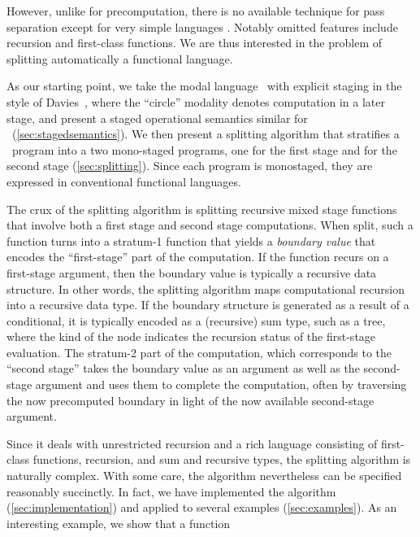 However, unlike for precomputation, there is no available technique
for pass separation except for very simple languages
\cite{knoblock96,Proudfoot:2001,Foley:2011,He:2014}.  Notably omitted
features include recursion and first-class functions.  We are thus
interested in the problem of splitting automatically a functional
language.
%


As our starting point, we take the modal language \lang\ with explicit
staging in the style of Davies~\cite{davies96}, where the ``circle''
modality denotes computation in a later stage, and present a staged
operational semantics similar for \lang\ (\ref{sec:stagedsemantics}).
We then present a splitting algorithm that stratifies a \lang\ program
into a two mono-staged programs, one for the first stage and for the
second stage (\ref{sec:splitting}).  Since each program is monostaged,
they are expressed in conventional functional languages.

The crux of the splitting algorithm is splitting recursive mixed stage
functions that involve both a first stage and second stage
computations.  When split, such a function turns into a stratum-1
function that yields a {\em boundary value} that encodes the
``first-stage'' part of the computation.  If the function recurs on a
first-stage argument, then the boundary value is typically a recursive
data structure.  In other words, the splitting algorithm maps
computational recursion into a recursive data type. If the boundary
structure is generated as a result of a conditional, it is typically
encoded as a (recursive) sum type, such as a tree, where the kind of
the node indicates the recursion status of the first-stage evaluation.
The stratum-2 part of the computation, which corresponds to the
``second stage'' takes the boundary value as an argument as well as
the second-stage argument and uses them to complete the computation,
often by traversing the now precomputed boundary in light of the now
available second-stage argument.

Since it deals with unrestricted recursion and a rich language
consisting of first-class functions, recursion, and sum and recursive
types, the splitting algorithm is naturally complex. With some care,
the algorithm nevertheless can be specified reasonably succinctly.  In
fact, we have implemented the algorithm (\ref{sec:implementation}) and
applied to several examples (\ref{sec:examples}).  As an interesting
example, we show that a function 


